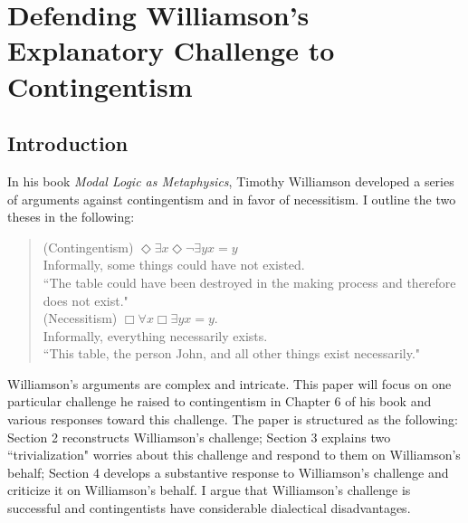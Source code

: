 \chapter{Defending Williamson's Explanatory Challenge to Contingentism}

\section{Introduction}
In his book \emph{Modal Logic as Metaphysics}, Timothy Williamson developed a series of arguments against contingentism and in favor of necessitism. I outline the two theses in the following: 
\begin{quote}
(Contingentism) \hspace{\labelsep} $\Diamond \exists x \Diamond \neg \exists y x=y$ \smallskip \\
Informally, some things could have not existed. \smallskip \\
``The table could have been destroyed in the making process and therefore does not exist." \bigskip \\
(Necessitism) \hspace{\labelsep} $\Box \forall x \Box \exists y x=y$.  \smallskip \\
Informally, everything necessarily exists. \smallskip \\
``This table, the person John, and all other things exist necessarily."
\end{quote}
Williamson's arguments are complex and intricate. This paper will focus on one particular challenge he raised to contingentism in Chapter 6 of his book and various responses toward this challenge. The paper is structured as the following: Section 2 reconstructs Williamson's challenge; Section 3 explains two ``trivialization" worries about this challenge and respond to them on Williamson's behalf; Section 4 develops a substantive response to Williamson's challenge and criticize it on Williamson's behalf. I argue that Williamson's challenge is successful and contingentists have considerable dialectical disadvantages.  

